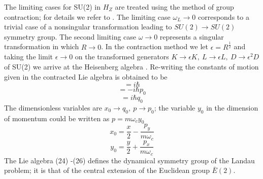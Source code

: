 \documentclass[aps, singlecolumn, showpacs]{revtex4-2}
\begin{document}
The limiting cases for SU(2) in $H_Z$ are treated using the method of group contraction; for details we refer to \cite{16}. The limiting case $\omega_L \rightarrow 0$ corresponds to a trivial case of a nonsingular transformation leading to $SU(2) \rightarrow SU(2)$ symmetry group. The second limiting case $\omega \rightarrow 0$ represents a singular transformation in which $R \rightarrow 0$. In the contraction method we let $\epsilon = R^\frac{1}{2}$ and taking the limit $\epsilon \rightarrow 0$ on the transformed generators $K \rightarrow \epsilon K, ~L \rightarrow \epsilon L,~ D \rightarrow \epsilon^2 D$ of SU(2) we arrive at the Heisenberg algebra \cite{16}. Re-writing the constants of motion given in \cite{14} the contracted Lie algebra is obtained to be
\begin{equation}
[x_0, p]= i \hbar
\end{equation}
\begin{equation}
[q_0, L ] =-i \hbar p_0
\end{equation}
\begin{equation}
[p_0, L] = i \hbar q_0
\end {equation}
The dimensionless variables are $x_0 \rightarrow q_0, ~ p \rightarrow p_0$; the variable $y_0$ in the dimension of momentum could be written as $p=m \omega_c y_0$ 
\begin{equation}
x_0 =\frac{x}{2} - \frac{p_y}{m \omega_c}
\end{equation}
\begin{equation}
y_0 =\frac{y}{2} + \frac{p_x}{m \omega_c}
\end{equation}
The Lie algebra (24) -(26) defines the dynamical symmetry group of the Landau problem; it is that of the central extension of the Euclidean group $\bar{E}(2)$.
\end{document}
